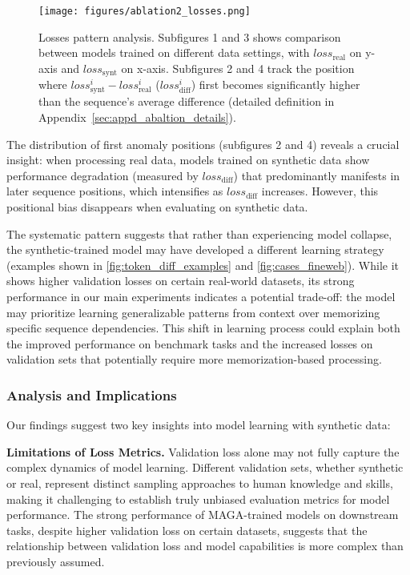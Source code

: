 \begin{figure*}[h]
    \vspace{-1em}
    \centering
    \texttt{[image: figures/ablation2\_losses.png]}
    \vspace{-2em}
\caption{Losses pattern analysis. Subfigures 1 and 3 shows comparison between models trained on different data settings, with $loss_{\text{real}}$ on y-axis and $loss_{\text{synt}}$ on x-axis.
Subfigures 2 and 4 track the position where $loss^i_{\text{synt}}-loss^i_{\text{real}}$ ($loss^i_{\text{diff}}$) first becomes significantly higher than the sequence's average difference (detailed definition in Appendix~\ref{sec:appd_abaltion_details}).}
\label{fig:doc_loss}
\end{figure*}

The distribution of first anomaly positions (subfigures 2 and 4) reveals a crucial insight:
when processing real data, models trained on synthetic data show performance degradation (measured by $loss_{\text{diff}}$) that predominantly manifests in later sequence positions,
which intensifies as $loss_{\text{diff}}$ increases.
However, this positional bias disappears when evaluating on synthetic data.

The systematic pattern suggests that rather than experiencing model collapse,
the synthetic-trained model may have developed a different learning strategy (examples shown in \autoref{fig:token_diff_examples} and \autoref{fig:cases_fineweb}).
While it shows higher validation losses on certain real-world datasets,
its strong performance in our main experiments indicates a potential trade-off:
the model may prioritize learning generalizable patterns from context over memorizing specific sequence dependencies.
This shift in learning process could explain both the improved performance on benchmark tasks
and the increased losses on validation sets that potentially require more memorization-based processing.


\subsubsection{Analysis and Implications}
Our findings suggest two key insights into model learning with synthetic data:

\textbf{Limitations of Loss Metrics.}
Validation loss alone may not fully capture the complex dynamics of model learning.
Different validation sets, whether synthetic or real,  represent distinct sampling approaches to human knowledge and skills,
making it challenging to establish truly unbiased evaluation metrics for model performance.
The strong performance of MAGA-trained models on downstream tasks,
despite higher validation loss on certain datasets,
suggests that the relationship between validation loss and model capabilities is more complex than previously assumed.


